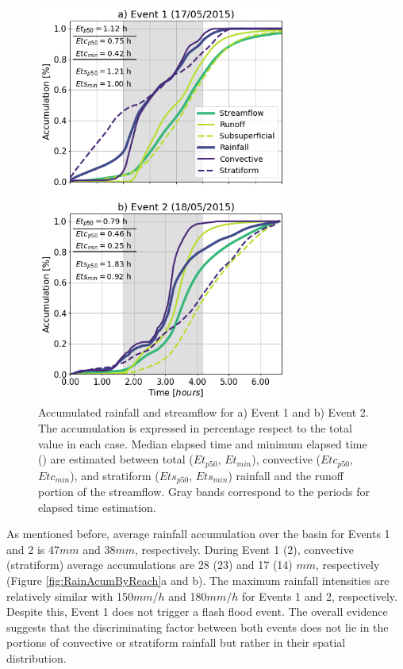 \documentclass[hess, manuscript]{copernicus}
\begin{document}
\begin{figure}[t]
\centering
 \includegraphics[width=8.3cm]{Figures/Rain_Streamflow_Elapsed.png}
 \caption{Accumulated rainfall and streamflow for a)  Event 1 and b) Event 2. The accumulation is expressed in percentage respect to the total value in each case. Median elapsed time and minimum elapsed time () are estimated between total ($Et_{p50}$, $Et_{min}$), convective ($Etc_{p50}$, $Etc_{min}$), and stratiform ($Ets_{p50}$, $Ets_{min}$) rainfall and the runoff portion of the streamflow.  Gray bands correspond to the periods for elapsed time estimation.}
    \label{fig:lluviaElapsedCaudal}
\end{figure}

As mentioned before, average rainfall accumulation over the basin for Events 1 and 2 is 47$mm$ and 38$mm$, respectively. During  Event 1 (2), convective (stratiform) average accumulations are 28 (23) and 17 (14) $mm$, respectively (Figure \ref{fig:RainAcumByReach}a and b).  The maximum rainfall intensities are relatively similar with 150$mm/h$ and 180$mm/h$ for Events 1 and 2, respectively.  Despite this, Event 1 does not trigger a flash flood event. The overall evidence suggests that the discriminating factor between both events does not lie in the portions of convective or stratiform rainfall but rather in their spatial distribution. \\
\end{document}
